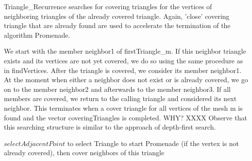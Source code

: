 \documentclass[10pt]{article}
\begin{document}
{\ttfamily Triangle\_Recurrence} searches for covering triangles for the vertices of neighboring triangles of the already covered triangle. Again, 'close' covering triangle that are already found are used to accelerate the termination of the algorithm {\ttfamily Promenade}.

We start with the member {\ttfamily neighbor1} of {\ttfamily firstTriangle\_m}. If this neighbor triangle exists and its vertices are not yet covered, we do so using the same procedure as in {\ttfamily findVertices}. After the triangle is covered, we consider its member {\ttfamily neighbor1}. At the moment when either a neighbor does not exist or is already covered, we go on to the member {\ttfamily neighbor2} and afterwards to the member {\ttfamily neighbor3}. If all members are covered, we return to the calling triangle and considered its next neighbor. This terminates when a cover triangle for all vertices of the mesh {\ttfamily m} is found and the vector {\ttfamily coveringTriangles} is completed. WHY? XXXX Observe that this searching structure is similar to the approach of depth-first search. 

$selectAdjacentPoint$ to select Triangle to start {\ttfamily Promenade} (if the vertex is not already covered), then cover neighbors of this triangle
\end{document}
